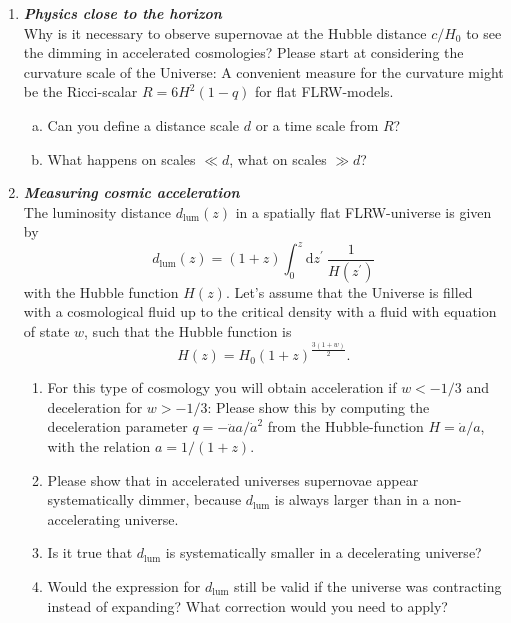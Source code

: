 \documentclass[a4paper,12pt]{article}
\newcommand{\question}[1]{\textbf{\textit{#1}}}
\begin{document}
\begin{enumerate}
\item \question{Physics close to the horizon}\\
Why is it necessary to observe supernovae at the Hubble distance $c/H_0$ to see the dimming in accelerated cosmologies? Please start at considering the curvature scale of the Universe: A convenient measure for the curvature might be the Ricci-scalar $R = 6H^2(1-q)$ for flat FLRW-models.
\begin{enumerate}[(a)]
\item{Can you define a distance scale $d$ or a time scale from $R$?}
\item{What happens on scales $\ll d$, what on scales $\gg d$?}
\end{enumerate}


\item \question{Measuring cosmic acceleration}\\
The luminosity distance $d_\mathrm{lum}(z)$ in a spatially flat FLRW-universe is given by
\begin{equation}
d_\mathrm{lum}(z) = (1+z)\int_0^z\mathrm{d}z^\prime\:\frac{1}{H(z^\prime)}
\end{equation}
with the Hubble function $H(z)$. Let's assume that the Universe is filled with a cosmological fluid up to the critical density with a fluid with equation of state $w$, such that the Hubble function is
\begin{equation}
H(z) = H_0 (1+z)^\frac{3(1+w)}{2}.
\end{equation}
\begin{enumerate}
\item{For this type of cosmology you will obtain acceleration if $w<-1/3$ and deceleration for $w>-1/3$: Please show this by computing the deceleration parameter $q=-\ddot{a}a/\dot{a}^2$ from the Hubble-function $H=\dot{a}/a$, with the relation $a=1/(1+z)$.}
\item{Please show that in accelerated universes supernovae appear systematically dimmer, because $d_\mathrm{lum}$ is always larger than in a non-accelerating universe.}
\item{Is it true that $d_\mathrm{lum}$ is systematically smaller in a decelerating universe?}
\item{Would the expression for $d_\mathrm{lum}$ still be valid if the universe was contracting instead of expanding? What correction would you need to apply?}
\end{enumerate}

\end{enumerate}
\end{document}
